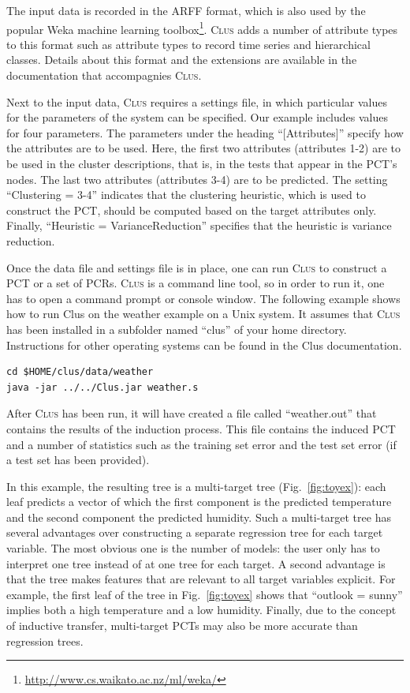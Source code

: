 \documentclass[a4paper]{report}
\newcommand{\clus}{\textsc{Clus}}
\begin{document}
The input data is recorded in the ARFF format, which is also used by the popular Weka machine learning toolbox\footnote{\url{http://www.cs.waikato.ac.nz/ml/weka/}}. \clus{} adds a number of attribute types to this format such as attribute types to record time series and hierarchical classes. Details about this format and the extensions are available in the documentation that accompagnies \clus{}.

Next to the input data, \clus{} requires a settings file, in which particular values for the parameters of the system can be specified. Our example includes values for four parameters. The parameters under the heading ``[Attributes]'' specify how the attributes are to be used. Here, the first two attributes (attributes 1-2) are to be used in the cluster descriptions, that is, in the tests that appear in the PCT's nodes. The last two attributes (attributes 3-4) are to be predicted. The setting ``Clustering = 3-4'' indicates that the clustering heuristic, which is used to construct the PCT, should be computed based on the target attributes only. Finally, ``Heuristic = VarianceReduction'' specifies that the heuristic is variance reduction.

Once the data file and settings file is in place, one can run \clus{} to construct a PCT or a set of PCRs. \clus{} is a command line tool, so in order to run it, one has to open a command prompt or console window. The following example shows how to run Clus on the weather example on a Unix system. It assumes that \clus{} has been installed in a subfolder named ``clus'' of your home directory. Instructions for other operating systems can be found in the Clus documentation.

\begin{Verbatim}[baselinestretch=1,fontsize=\footnotesize,fontshape=n]
cd $HOME/clus/data/weather
java -jar ../../Clus.jar weather.s
\end{Verbatim}

After \clus{} has been run, it will have created a file called ``weather.out'' that contains the results of the induction process. This file contains the induced PCT and a number of statistics such as the training set error and the test set error (if a test set has been provided).

In this example, the resulting tree is a multi-target tree (Fig.~\ref{fig:toyex}): each leaf predicts a vector of which the first component is the predicted temperature and the second component the predicted humidity. Such a multi-target tree has several advantages over constructing a separate regression tree for each target variable. The most obvious one is the number of models: the user only has to interpret one tree instead of at one tree for each target. A second advantage is that the tree makes features that are relevant to all target variables explicit. For example, the first leaf of the tree in Fig.~\ref{fig:toyex} shows that ``outlook = sunny'' implies both a high temperature and a low humidity. Finally, due to the concept of inductive transfer, multi-target PCTs may also be more accurate than regression trees.
\end{document}
